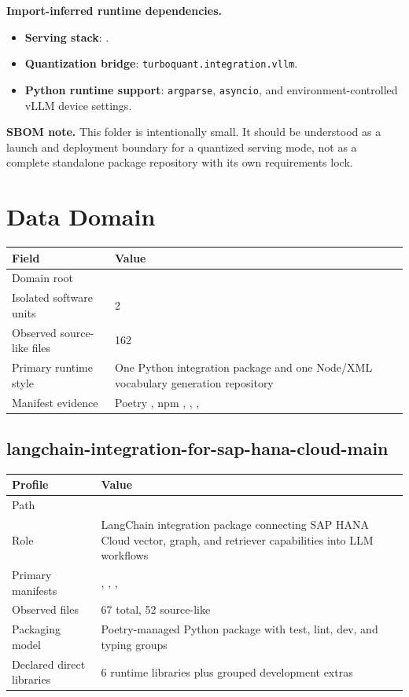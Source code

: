 \documentclass[11pt,a4paper]{article}
\begin{document}
\textbf{Import-inferred runtime dependencies.}
\begin{itemize}[leftmargin=*]
    \item \textbf{Serving stack}: .
    \item \textbf{Quantization bridge}: \texttt{turboquant.integration.vllm}.
    \item \textbf{Python runtime support}: \texttt{argparse}, \texttt{asyncio}, and environment-controlled vLLM device settings.
\end{itemize}

\textbf{SBOM note.} This folder is intentionally small. It should be understood as a launch and deployment boundary for a quantized serving mode, not as a complete standalone package repository with its own requirements lock.

\newpage
\section{Data Domain}

\begin{tabular}{@{}P{4.2cm}P{9.8cm}@{}}
\toprule
\textbf{Field} & \textbf{Value} \\
\midrule
Domain root &  \\
Isolated software units & 2 \\
Observed source-like files & 162 \\
Primary runtime style & One Python integration package and one Node/XML vocabulary generation repository \\
Manifest evidence & Poetry , npm , , ,  \\
\bottomrule
\end{tabular}

\subsection{langchain-integration-for-sap-hana-cloud-main}

\begin{tabular}{@{}P{4.2cm}P{9.8cm}@{}}
\toprule
\textbf{Profile} & \textbf{Value} \\
\midrule
Path &  \\
Role & LangChain integration package connecting SAP HANA Cloud vector, graph, and retriever capabilities into LLM workflows \\
Primary manifests & , , ,  \\
Observed files & 67 total, 52 source-like \\
Packaging model & Poetry-managed Python package with test, lint, dev, and typing groups \\
Declared direct libraries & 6 runtime libraries plus grouped development extras \\
\bottomrule
\end{tabular}
\end{document}
